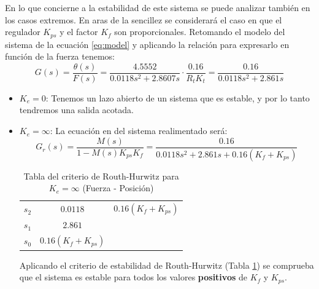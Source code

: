 En lo que concierne a la estabilidad de este sistema se puede analizar también en los casos extremos. En aras de la sencillez se considerará el caso en que el regulador $K_{ps}$ y el factor $K_{f}$ son proporcionales.
Retomando el modelo del sistema de la ecuación \eqref{eq:model} y aplicando la relación para expresarlo en función de la fuerza tenemos:
\begin{equation}
G(s) = \dfrac{\theta(s)}{F(s)} = \dfrac{4.5552}{0.0118s^2 + 2.8607s}\cdot \dfrac{0.16}{R_tK_t} = \dfrac{0.16}{0.0118 s^2 + 2.861 s}
\end{equation}
\begin{itemize}
\item $K_e = 0$: Tenemos un lazo abierto de un sistema que es estable, y por lo tanto tendremos una salida acotada.

\item $K_e = \infty$: La ecuación en del sistema realimentado será:
\begin{equation}
G_r(s) = \dfrac{M(s)}{1 - M(s)K_{ps}K_f} = \dfrac{0.16}{0.0118 s^2 + 2.861 s + 0.16(K_f+K_{ps})}
\end{equation}
\begin{table}[htbp]
  \caption{Tabla del criterio de Routh-Hurwitz para $K_e = \infty$ (Fuerza - Posición)}
  \centering
    \begin{tabular}{ccc}
    \toprule
    $s_2$	& $0.0118$		& $0.16(K_f+K_{ps})$ \\
    $s_1$	& $2.861$		& 	\\
 	$s_0$	& $0.16(K_f+K_{ps})$		& 	\\
    \bottomrule
    \end{tabular}
  \label{tab:force-pos-routh}
\end{table}
Aplicando el criterio de estabilidad de Routh-Hurwitz (Tabla \ref{tab:force-pos-routh}) se comprueba que el sistema es estable para todos los valores \textbf{positivos} de $K_{f}$ y $K_{ps}$.
\end{itemize}

